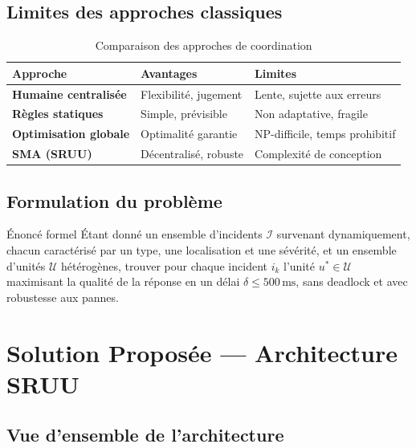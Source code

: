 \documentclass[12pt, a4paper]{report}
\begin{document}
\section{Limites des approches classiques}

\begin{table}[H]
\centering
\caption{Comparaison des approches de coordination}
\begin{tabularx}{\textwidth}{>{\bfseries}lXX}
\toprule
\rowcolor{NavyCard!15}
\color{CyanNeon}Approche & \color{CyanNeon}Avantages & \color{OrangeNeon}Limites \\
\midrule
Humaine centralisée    & Flexibilité, jugement        & Lente, sujette aux erreurs \\
Règles statiques       & Simple, prévisible           & Non adaptative, fragile \\
Optimisation globale   & Optimalité garantie          & NP-difficile, temps prohibitif \\
\textbf{SMA (SRUU)}    & Décentralisé, robuste        & Complexité de conception \\
\bottomrule
\end{tabularx}
\end{table}

\section{Formulation du problème}

\begin{infobox}{Énoncé formel}
Étant donné un ensemble d'incidents $\mathcal{I}$ survenant dynamiquement, chacun
caractérisé par un type, une localisation et une sévérité, et un ensemble d'unités
$\mathcal{U}$ hétérogènes, trouver pour chaque incident $i_k$ l'unité
$u^* \in \mathcal{U}$ maximisant la qualité de la réponse en un délai
$\delta \leq 500\,\text{ms}$, sans deadlock et avec robustesse aux pannes.
\end{infobox}

\chapter{Solution Proposée — Architecture SRUU}
\label{chap:solution}

\section{Vue d'ensemble de l'architecture}
\end{document}
